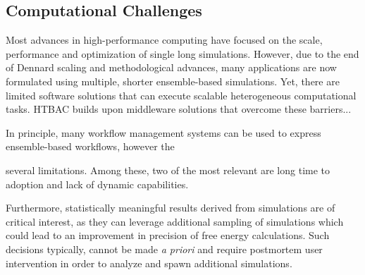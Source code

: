 \subsection{Computational Challenges}




Most advances in high-performance computing have focused on the scale,
performance and optimization of single long simulations. However, due to the
end of Dennard scaling and methodological advances, many applications are now
formulated using multiple, shorter ensemble-based simulations. Yet, there are
limited software solutions that can execute scalable heterogeneous
computational tasks. HTBAC builds upon middleware solutions that overcome
these barriers...




In principle, many workflow management systems can be used to express
ensemble-based workflows, however the

several limitations. Among these, two of the most relevant are long time to
adoption and lack of dynamic capabilities.


Furthermore, statistically meaningful results derived from simulations are of
critical interest, as they can leverage additional sampling of simulations
which could lead to an improvement in precision of free energy calculations.
Such decisions typically, cannot be made {\it a priori} and require postmortem
user intervention in order to analyze and spawn additional simulations.


